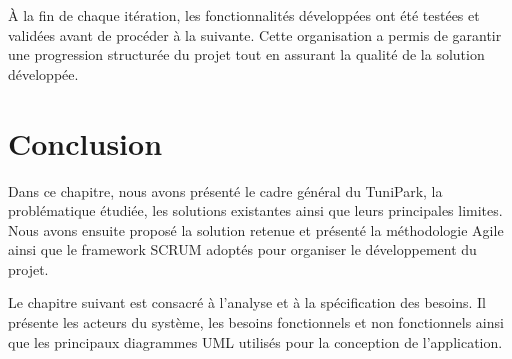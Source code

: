 \par À la fin de chaque itération, les fonctionnalités développées ont été testées et validées avant de procéder à la suivante. Cette organisation a permis de garantir une progression structurée du projet tout en assurant la qualité de la solution développée.

\section{Conclusion}

\par Dans ce chapitre, nous avons présenté le cadre général du TuniPark, la problématique étudiée, les solutions existantes ainsi que leurs principales limites. Nous avons ensuite proposé la solution retenue et présenté la méthodologie Agile ainsi que le framework SCRUM adoptés pour organiser le développement du projet.

\par Le chapitre suivant est consacré à l'analyse et à la spécification des besoins. Il présente les acteurs du système, les besoins fonctionnels et non fonctionnels ainsi que les principaux diagrammes UML utilisés pour la conception de l'application.